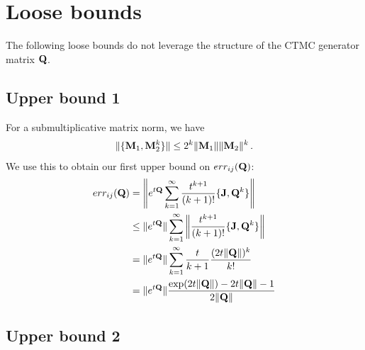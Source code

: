 \documentclass[12pt]{article} %
\begin{document}

\appendix

\section{Loose bounds}\label{sec:loose}

The following loose bounds do not leverage the structure of the CTMC generator matrix $\mathbf{Q}$.

\subsection{Upper bound 1}



For a submultiplicative matrix norm, we have
\begin{align*}
	\Vert \{\mathbf{M}_1, \mathbf{M}_2^k \}  \Vert \leq 2^k \Vert \mathbf{M}_1\Vert \Vert\mathbf{M}_2 \Vert ^k \, .
\end{align*}
We use this to obtain our first upper bound on $err_{ij}(\mathbf{Q})$:
\begin{align*}
	err_{ij}(\mathbf{Q}) &= \left\Vert e^{t\mathbf{Q}}  \sum_{k=1}^\infty \frac{t^{k+1}}{(k+1)!} \{\mathbf{J},\mathbf{Q}^k\} \right\Vert  \\
	&\leq \Vert e^{t\mathbf{Q}} \Vert \sum_{k=1}^\infty \left\Vert \frac{t^{k+1}}{(k+1)!} \{\mathbf{J},\mathbf{Q}^k\} \right\Vert  \\
	&=  \Vert e^{t\mathbf{Q}} \Vert \sum_{k=1}^\infty \frac{t}{k+1} \frac{(2t \Vert \mathbf{Q} \Vert)^k}{k!}\\
	&= \Vert e^{t\mathbf{Q}} \Vert   \frac{\exp(2t\Vert \mathbf{Q} \Vert)-2t\Vert\mathbf{Q}\Vert-1}{2\Vert \mathbf{Q} \Vert} 
\end{align*}


\subsection{Upper bound 2}
\end{document}
